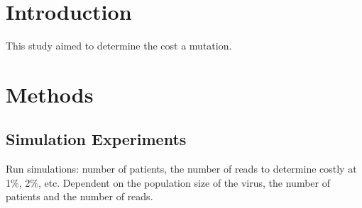 
\section{Introduction}

This study aimed to determine the cost a mutation. 


\section{Methods}

\subsection{Simulation Experiments}
Run simulations: number of patients, the number of reads to determine costly at 1\%, 2\%, etc. Dependent on the population size of the virus, the number of patients and the number of reads. 
\section{}
